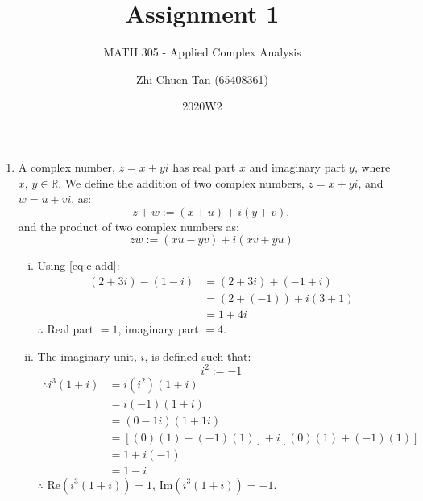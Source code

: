 \documentclass[a4paper, titlepage, DIV=14]{scrartcl}
\title{Assignment 1}
\subtitle{MATH 305 - Applied Complex Analysis}
\author{Zhi Chuen Tan (65408361)}
\date{2020W2}
\begin{document}
    \onehalfspacing
    \hypersetup{pageanchor=false}
    \begin{titlepage}
        \maketitle
        \vfill
        
    \end{titlepage}
    \hypersetup{pageanchor=true}

    \begin{enumerate}
        \item A complex number, $z = x + yi$ has real part $x$ and imaginary
            part $y$, where $x, \, y \in \mathbb{R}$. We define the addition of two complex numbers, 
            $z = x+yi$, and $w=u+vi$, as:
            \begin{equation}
                z + w := (x+u) + i(y+v), \label{eq:c-add}
            \end{equation} and the product of two complex numbers as:
            \begin{equation}
                zw := (xu - yv) + i(xv+yu) \label{eq:c-prod}
            \end{equation}
        
        \begin{enumerate}[i)]
            \item Using \autoref{eq:c-add}:
            \begin{align*}
                (2+3i) - (1-i) &= (2+3i) + (-1+i) \\
                               &= (2+(-1)) + i (3+1) \\
                                &= 1 + 4i
            \end{align*}
            $\therefore$ Real part $=1$, imaginary part $=4$. \\

            \item The imaginary unit, $i$, is defined such that:
            \begin{equation}
                i^{2} := -1 \label{eq:i}
            \end{equation}
            \begin{align*}
                \therefore i^{3}(1+i) &= i(i^{2})(1+i) \\
                                    &= i(-1)(1+i)\\
                                    &= (0 - 1i)(1+1i) \\
                                    &= [(0)(1)-(-1)(1)] + i[(0)(1)+(-1)(1)] \\
                                    &= 1 + i(-1) \\
                                    &= 1 - i
            \end{align*}
            $\therefore$ Re$(i^{3}(1+i))=1$, Im$(i^{3}(1+i))=-1$. \\


\end{enumerate}
\end{enumerate}
\end{document}
